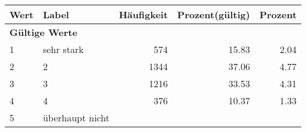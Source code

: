      \begin{longtable}{lXrrr}
     \toprule
     \textbf{Wert} & \textbf{Label} & \textbf{Häufigkeit} & \textbf{Prozent(gültig)} & \textbf{Prozent} \\
     \endhead
     \midrule
     \multicolumn{5}{l}{\textbf{Gültige Werte}}\\

     1 &
     \multicolumn{1}{X}{ sehr stark   } &


       \num{574} &
       \num[round-mode=places,round-precision=2]{15.83} &
         \num[round-mode=places,round-precision=2]{2.04} \\

     2 &
     \multicolumn{1}{X}{ 2   } &


       \num{1344} &
       \num[round-mode=places,round-precision=2]{37.06} &
         \num[round-mode=places,round-precision=2]{4.77} \\

     3 &
     \multicolumn{1}{X}{ 3   } &


       \num{1216} &
       \num[round-mode=places,round-precision=2]{33.53} &
         \num[round-mode=places,round-precision=2]{4.31} \\

     4 &
     \multicolumn{1}{X}{ 4   } &


       \num{376} &
       \num[round-mode=places,round-precision=2]{10.37} &
         \num[round-mode=places,round-precision=2]{1.33} \\

     5 &
     \multicolumn{1}{X}{ überhaupt nicht   } &



\end{longtable}
